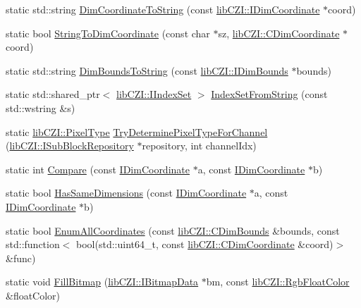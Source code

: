 \begin{DoxyCompactItemize}
static std\+::string \hyperlink{classlib_c_z_i_1_1_utils_aeb42843e65615302b51b68ad2b376e6d}{Dim\+Coordinate\+To\+String} (const \hyperlink{classlib_c_z_i_1_1_i_dim_coordinate}{lib\+C\+Z\+I\+::\+I\+Dim\+Coordinate} $\ast$coord)
\item 
static bool \hyperlink{classlib_c_z_i_1_1_utils_a3c3cf0e18a7588ff708bf279db79db95}{String\+To\+Dim\+Coordinate} (const char $\ast$sz, \hyperlink{classlib_c_z_i_1_1_c_dim_coordinate}{lib\+C\+Z\+I\+::\+C\+Dim\+Coordinate} $\ast$coord)
\item 
static std\+::string \hyperlink{classlib_c_z_i_1_1_utils_a63811f2fb98b3c15e0203b22ab1bbbe0}{Dim\+Bounds\+To\+String} (const \hyperlink{classlib_c_z_i_1_1_i_dim_bounds}{lib\+C\+Z\+I\+::\+I\+Dim\+Bounds} $\ast$bounds)
\item 
static std\+::shared\+\_\+ptr$<$ \hyperlink{classlib_c_z_i_1_1_i_index_set}{lib\+C\+Z\+I\+::\+I\+Index\+Set} $>$ \hyperlink{classlib_c_z_i_1_1_utils_a69fdbdc41c4700f35a648a516757bbca}{Index\+Set\+From\+String} (const std\+::wstring \&s)
\item 
static \hyperlink{namespacelib_c_z_i_abf8ce12ab88b06c8b3b47efbb5e2e834}{lib\+C\+Z\+I\+::\+Pixel\+Type} \hyperlink{classlib_c_z_i_1_1_utils_ad105cc3a3791e6dd269116de0f71de04}{Try\+Determine\+Pixel\+Type\+For\+Channel} (\hyperlink{classlib_c_z_i_1_1_i_sub_block_repository}{lib\+C\+Z\+I\+::\+I\+Sub\+Block\+Repository} $\ast$repository, int channel\+Idx)
\item 
static int \hyperlink{classlib_c_z_i_1_1_utils_a22bcbac6bcfb783d6dd3fbdb7c3b4f5f}{Compare} (const \hyperlink{classlib_c_z_i_1_1_i_dim_coordinate}{I\+Dim\+Coordinate} $\ast$a, const \hyperlink{classlib_c_z_i_1_1_i_dim_coordinate}{I\+Dim\+Coordinate} $\ast$b)
\item 
static bool \hyperlink{classlib_c_z_i_1_1_utils_a12906a27e0e3fbf65f999c9387782cbc}{Has\+Same\+Dimensions} (const \hyperlink{classlib_c_z_i_1_1_i_dim_coordinate}{I\+Dim\+Coordinate} $\ast$a, const \hyperlink{classlib_c_z_i_1_1_i_dim_coordinate}{I\+Dim\+Coordinate} $\ast$b)
\item 
static bool \hyperlink{classlib_c_z_i_1_1_utils_a38d50d87b67917004a2f0c8156ecee6d}{Enum\+All\+Coordinates} (const \hyperlink{classlib_c_z_i_1_1_c_dim_bounds}{lib\+C\+Z\+I\+::\+C\+Dim\+Bounds} \&bounds, const std\+::function$<$ bool(std\+::uint64\+\_\+t, const \hyperlink{classlib_c_z_i_1_1_c_dim_coordinate}{lib\+C\+Z\+I\+::\+C\+Dim\+Coordinate} \&coord)$>$ \&func)
\item 
static void \hyperlink{classlib_c_z_i_1_1_utils_a95ff03d97620e252f08a8366fdead551}{Fill\+Bitmap} (\hyperlink{classlib_c_z_i_1_1_i_bitmap_data}{lib\+C\+Z\+I\+::\+I\+Bitmap\+Data} $\ast$bm, const \hyperlink{structlib_c_z_i_1_1_rgb_float_color}{lib\+C\+Z\+I\+::\+Rgb\+Float\+Color} \&float\+Color)
\end{DoxyCompactItemize}



